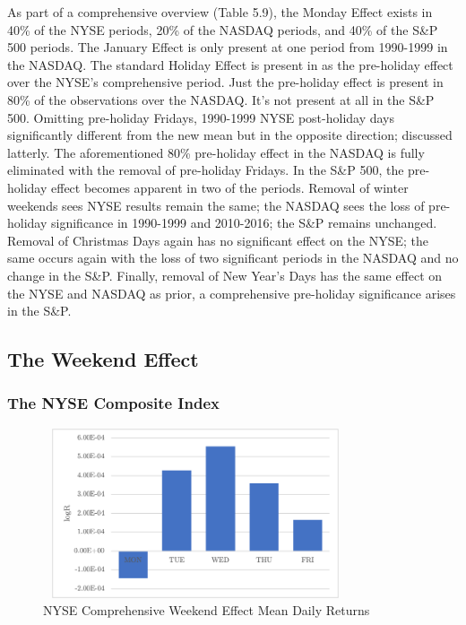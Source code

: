 \documentclass[11pt, english]{article}
\begin{document}
	As part of a comprehensive overview (Table 5.9), the Monday Effect exists in 40\% of the NYSE periods, 20\% of the NASDAQ periods, and 40\% of the S\&P 500 periods. The January Effect is only present at one period from 1990-1999 in the NASDAQ. The standard Holiday Effect is present in as the pre-holiday effect over the NYSE’s comprehensive period. Just the pre-holiday effect is present in 80\% of the observations over the NASDAQ. It’s not present at all in the S\&P 500. Omitting pre-holiday Fridays, 1990-1999 NYSE post-holiday days significantly different from the new mean but in the opposite direction; discussed latterly. The aforementioned 80\% pre-holiday effect in the NASDAQ is fully eliminated with the removal of pre-holiday Fridays. In the S\&P 500, the pre-holiday effect becomes apparent in two of the periods. Removal of winter weekends sees NYSE results remain the same; the NASDAQ sees the loss of pre-holiday significance in 1990-1999 and 2010-2016; the S\&P remains unchanged. Removal of Christmas Days again has no significant effect on the NYSE; the same occurs again with the loss of two significant periods in the NASDAQ and no change in the S\&P. Finally, removal of New Year’s Days has the same effect on the NYSE and NASDAQ as prior, a comprehensive pre-holiday significance arises in the S\&P.

	\newpage

	\subsection{The Weekend Effect}

		\subsubsection{The NYSE Composite Index}

	\begin{figure}[H]
        \begin{center}
                \includegraphics[width=9cm,height=5cm]{NYSE-WE1.png}
                \caption{NYSE Comprehensive Weekend Effect Mean Daily Returns}
        \end{center}
        \end{figure}
\end{document}
